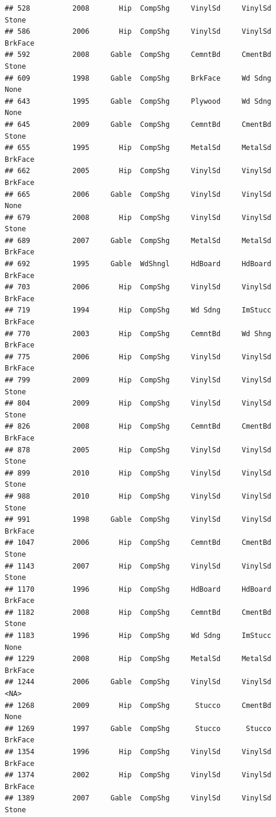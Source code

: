 \documentclass[]{article}
\begin{document}
\begin{verbatim}
## 528          2008       Hip  CompShg     VinylSd     VinylSd      Stone
## 586          2006       Hip  CompShg     VinylSd     VinylSd    BrkFace
## 592          2008     Gable  CompShg     CemntBd     CmentBd      Stone
## 609          1998     Gable  CompShg     BrkFace     Wd Sdng       None
## 643          1995     Gable  CompShg     Plywood     Wd Sdng       None
## 645          2009     Gable  CompShg     CemntBd     CmentBd      Stone
## 655          1995       Hip  CompShg     MetalSd     MetalSd    BrkFace
## 662          2005       Hip  CompShg     VinylSd     VinylSd    BrkFace
## 665          2006     Gable  CompShg     VinylSd     VinylSd       None
## 679          2008       Hip  CompShg     VinylSd     VinylSd      Stone
## 689          2007     Gable  CompShg     MetalSd     MetalSd    BrkFace
## 692          1995     Gable  WdShngl     HdBoard     HdBoard    BrkFace
## 703          2006       Hip  CompShg     VinylSd     VinylSd    BrkFace
## 719          1994       Hip  CompShg     Wd Sdng     ImStucc    BrkFace
## 770          2003       Hip  CompShg     CemntBd     Wd Shng    BrkFace
## 775          2006       Hip  CompShg     VinylSd     VinylSd    BrkFace
## 799          2009       Hip  CompShg     VinylSd     VinylSd      Stone
## 804          2009       Hip  CompShg     VinylSd     VinylSd      Stone
## 826          2008       Hip  CompShg     CemntBd     CmentBd    BrkFace
## 878          2005       Hip  CompShg     VinylSd     VinylSd      Stone
## 899          2010       Hip  CompShg     VinylSd     VinylSd      Stone
## 988          2010       Hip  CompShg     VinylSd     VinylSd      Stone
## 991          1998     Gable  CompShg     VinylSd     VinylSd    BrkFace
## 1047         2006       Hip  CompShg     CemntBd     CmentBd      Stone
## 1143         2007       Hip  CompShg     VinylSd     VinylSd      Stone
## 1170         1996       Hip  CompShg     HdBoard     HdBoard    BrkFace
## 1182         2008       Hip  CompShg     CemntBd     CmentBd      Stone
## 1183         1996       Hip  CompShg     Wd Sdng     ImStucc       None
## 1229         2008       Hip  CompShg     MetalSd     MetalSd    BrkFace
## 1244         2006     Gable  CompShg     VinylSd     VinylSd       <NA>
## 1268         2009       Hip  CompShg      Stucco     CmentBd       None
## 1269         1997     Gable  CompShg      Stucco      Stucco    BrkFace
## 1354         1996       Hip  CompShg     VinylSd     VinylSd    BrkFace
## 1374         2002       Hip  CompShg     VinylSd     VinylSd    BrkFace
## 1389         2007     Gable  CompShg     VinylSd     VinylSd      Stone

\end{verbatim}
\end{document}
